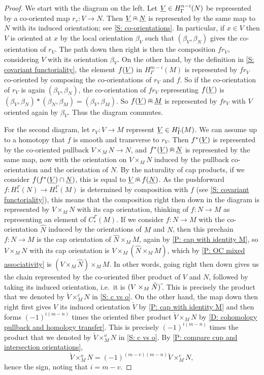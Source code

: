 \begin{proof}
	We start with the diagram on the left.
	Let $\underline{V} \in H^{n-i}_\Gamma(N)$ be represented by a co-oriented map $r_v \colon V \to N$.
	Then $\underline{V}\nplus\underline{N}$ is represented by the same map to $N$ with its induced orientation; see \cref{S: co-orientations}.
	In particular, if $x \in V$ then $V$ is oriented at $x$ by the local orientation $\beta_V$ such that $(\beta_V,\beta_N)$ gives the co-orientation of $r_V$.
	The path down then right is then the composition $fr_V$, considering $V$ with its orientation $\beta_V$.
	On the other hand, by the definition in \cref{S: covariant functoriality}, the element $f(\underline{V})$ in $H^{m-i}_\Gamma(M)$ is represented by $fr_V$ co-oriented by composing the co-orientations of $r_V$ and $f$.
	So if the co-orientation of $r_V$ is again $(\beta_V,\beta_N)$, the co-orientation of $fr_V$ representing $f(\underline{V})$ is $(\beta_V,\beta_N)*(\beta_N,\beta_M) = (\beta_V,\beta_M)$.
	So $f(\underline{V})\nplus \underline{M}$ is represented by $fr_V$ with $V$ oriented again by $\beta_V$.
	Thus the diagram commutes.

	For the second diagram, let $r_V \colon V \to M$ represent $\underline{V} \in H^{i}_\Gamma(M)$.
	We can assume up to a homotopy that $f$ is smooth and transverse to $r_V$.
	Then $f^*(\underline{V})$ is represented by the co-oriented pullback $V \times_M N \to N$, and $f^*(\underline{V})\nplus\underline{N}$ is represented by the same map, now with the orientation on $V \times_M N$ induced by the pullback co-orientation and the orientation of $N$.
	By the naturality of cap products, if we consider $f(f^*(\underline{V}) \cap \underline{N})$, this is equal to $\underline{V} \nplus f(\underline{N})$.
	As the pushforward $f \colon H_*^\Gamma(N) \to H_*^\Gamma(M)$ is determined by composition with $f$ (see \cref{S: covariant functoriality}), this means that the composition right then down in the diagram is represented by $V \times_M N$ with its cap orientation, thinking of $f \colon N \to M$ as representing an element of $C_*^\Gamma(M)$.
	If we consider $f \colon N \to M$ with the co-orientation $\hat N$ induced by the orientations of $M$ and $N$, then this prechain $f \colon N \to M$ is the cap orientation of $\hat N \times_M M$, again by \cref{P: cap with identity M}, so $V \times_M N$ with its cap orientation is $V \times_M (\hat N \times_M M)$, which by \cref{P: OC mixed associativity} is $(V \times_M \hat N) \times_M M$.
	In other words, going right then down gives us the chain represented by the co-oriented fiber product of $V$ and $N$, followed by taking its induced orientation, i.e.\ it is $(V \times_M \hat N)\,\check{\vrule height1.3ex width0pt}$.
	This is precisely the product that we denoted by $\check V \times^c_M N$ in \cref{S: c vs o}.
	On the other hand, the map down then right first gives $V$ its induced orientation $\check V$ by \cref{P: cap with identity M} and then forms $(-1)^{i(m-n)}$ times the oriented fiber product $\check V \times_M N$ by \cref{D: cohomology pullback and homology transfer}.
	This is precisely $(-1)^{i(m-n)}$ times the product that we denoted by $\check V \times^o_M N$ in \cref{S: c vs o}.
	By \cref{P: compare cup and intersection orientations},
	$$\check V \times_M^o N = (-1)^{(m-v)(m-n)} \check V \times_M^c N,$$
	hence the sign, noting that $i = m-v$.
\end{proof}
